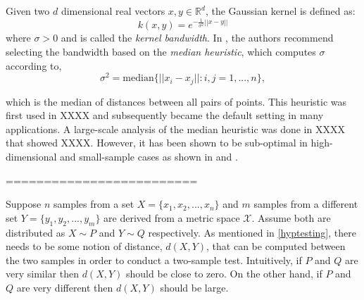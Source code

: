 Given two $d$ dimensional real vectors $x, y \in \mathbb{R}^d$, the Gaussian kernel is defined as:
\begin{equation}
k(x, y)= e^{-\frac{1}{\sigma^2}||x-y||}
\end{equation}
where $\sigma > 0$ and is called the \textit{kernel bandwidth}. In \cite{gretton2005kernel}, the authors recommend selecting the bandwidth based on the \textit{median heuristic}, which computes $\sigma$ according to, 
\begin{equation}
\sigma^2=\text{median}\{||x_i-x_j||:i,j = 1,...,n \},
\end{equation}

which is the median of distances between all pairs of points. This heuristic was first used in XXXX and subsequently became the default setting in many applications. A large-scale analysis of the median heuristic was done in XXXX that showed  XXXX. However, it has been shown to be sub-optimal in high-dimensional and small-sample cases as shown in \cite{muandet2014kernel} and \cite{ramdas2015decreasing}. 

=========================

Suppose $n$ samples from a set $X = \{x_1, x_2, ..., x_n\}$ and $m$ samples from a different set $Y=\{y_1, y_2, ..., y_m\}$ are derived from a metric space $\mathcal{X}$. Assume both are distributed as $X \sim  P$ and $Y \sim Q$ respectively. As mentioned in \ref{hyptesting}, there needs to be some notion of distance, $d(X,Y)$, that can be computed between the two samples in order to conduct a two-sample test. Intuitively, if $P$ and $Q$ are very similar then $d(X,Y)$ should be close to zero. On the other hand, if $P$ and $Q$ are very different then $d(X,Y)$ should be large.





